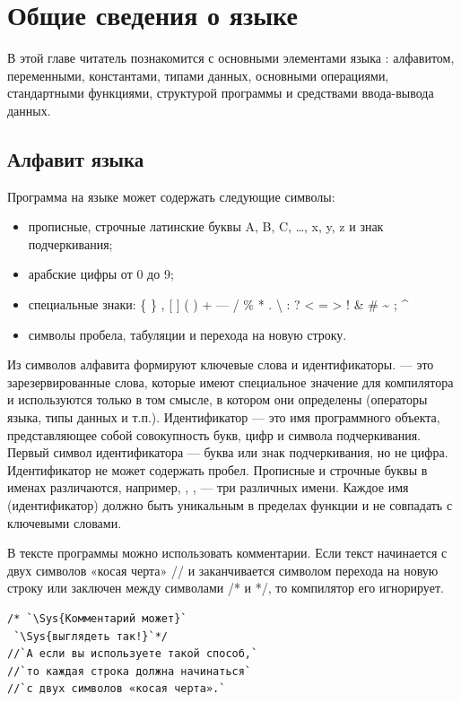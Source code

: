 \chapter[Общие сведения о языке \Sys{С++}]{Общие сведения о языке }\label{gl02}
В этой главе читатель познакомится с основными элементами языка : алфавитом, переменными, константами, типами данных,
основными операциями, стандартными функциями, структурой программы и средствами ввода-вывода данных.

\section[Алфавит языка]{Алфавит языка}
Программа на языке  может содержать следующие символы:
\begin{itemize}
\item прописные, строчные латинские буквы A, B, C, …, x, y, z и знак подчеркивания;
\item арабские цифры от 0 до 9;
\item специальные знаки:  \{ \} , {\textbar} [ ] ( ) + --- / \% * . {\textbackslash}  : ? {<} = {>} !
\& \# \~{} ; \^{}
\item символы пробела, табуляции и перехода на новую строку.
\end{itemize}

Из символов алфавита формируют ключевые слова и идентификаторы. 
 --- это зарезервированные слова, которые имеют специальное значение для компилятора и используются только в том смысле, в
котором они определены (операторы языка, типы данных и т.п.). Идентификатор ---
это имя программного объекта, представляющее собой совокупность букв, цифр и символа подчеркивания. Первый символ
идентификатора --- буква или знак подчеркивания, но не цифра. Идентификатор не может содержать пробел. Прописные и
строчные буквы в именах различаются, например, , ,  --- 
три различных имени. Каждое имя (идентификатор) должно быть уникальным в пределах функции и не совпадать с ключевыми
словами. 

В тексте программы можно использовать комментарии. Если текст начинается с двух
символов «косая черта» // и заканчивается символом перехода на новую строку или заключен между
символами /* и */, то компилятор его игнорирует. 

\begin{lstlisting}
/* `\Sys{Комментарий может}`
 `\Sys{выглядеть так!}`*/
//`А если вы используете такой способ,`
//`то каждая строка должна начинаться`
//`с двух символов «косая черта».`
\end{lstlisting}

